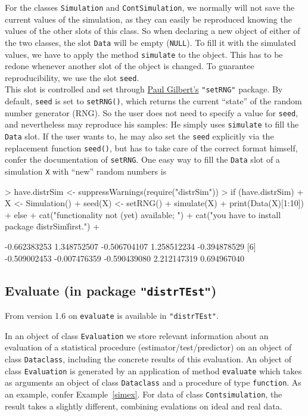 \documentclass[11pt]{article}
\newcommand{\code}[1]{{\tt #1}}
\newcommand{\pkg}[1]{{\tt "#1"}}
\begin{document}
For the classes \code{Simulation} and \code{ContSimulation}, we normally will
not save the current values of the simulation, as they can easily be reproduced
knowing the values of the other slots of this class.
%
So when declaring a new object of either of the two classes, the slot
\code{Data} will be empty (\code{NULL}).
To fill it with the simulated values, we have to apply the method
\code{simulate} to the object. This has to be redone whenever another slot of
the object is changed.
%
To guarantee reproducibility, we use the slot \code{seed}.\\
%
This slot is controlled and set through
\href{mailto:pgilbert@bank-banque-canada.ca}{Paul Gilbert's} \pkg{setRNG}
package.
By default, \code{seed} is set to \code{setRNG()}, which returns the current
``state'' of the random number generator (RNG). So the user does not need to
specify a value for \code{seed}, and nevertheless may reproduce his samples:
He simply uses \code{simulate} to fill the \code{Data} slot.
If the user wants to, he may also set the \code{seed} explicitly via the
replacement function \code{seed()}, but has to take care of the correct format
himself, confer the documentation of \code{setRNG}. One easy way to fill
the \code{Data} slot of a simulation \code{X} with ``new'' random numbers is
\begin{Schunk}
\begin{Sinput}
> have.distrSim <- suppressWarnings(require("distrSim"))
> if (have.distrSim)
+    {X <- Simulation()
+     seed(X) <- setRNG()
+     simulate(X)
+     print(Data(X)[1:10])
+    } else {
+     cat("\n functionality not (yet) available; ")
+     cat("you have to install package \"distrSim\" first.\n")
+     }
\end{Sinput}
\begin{Soutput}
 [1] -0.662383253  1.348752507 -0.506704107  1.258512234 -0.394878529
 [6] -0.509002453 -0.007476359 -0.590439080  2.212147319  0.694967040
\end{Soutput}
\end{Schunk}
%
\subsection[Evaluate (in package distrTEst)]%
{Evaluate (in package \pkg{distrTEst})}\label{evaluate}
%
From version 1.6 on \code{evaluate} is available in  \pkg{distrTEst}.

In an object of class \code{Evaluation}  we store relevant information
about an evaluation of a statistical procedure (estimator/test/predictor)
on an object of class \code{Dataclass}, including the concrete results of
this evaluation. An object of class \code{Evaluation}  is generated by an
application of method \code{evaluate} which takes as arguments an object of
class  \code{Dataclass} and a procedure of type \code{function}. As an example,
confer Example~\ref{simex}.
For data of class \code{Contsimulation}, the result takes a slightly different,
combining evalations on ideal and real data.
%
\end{document}
